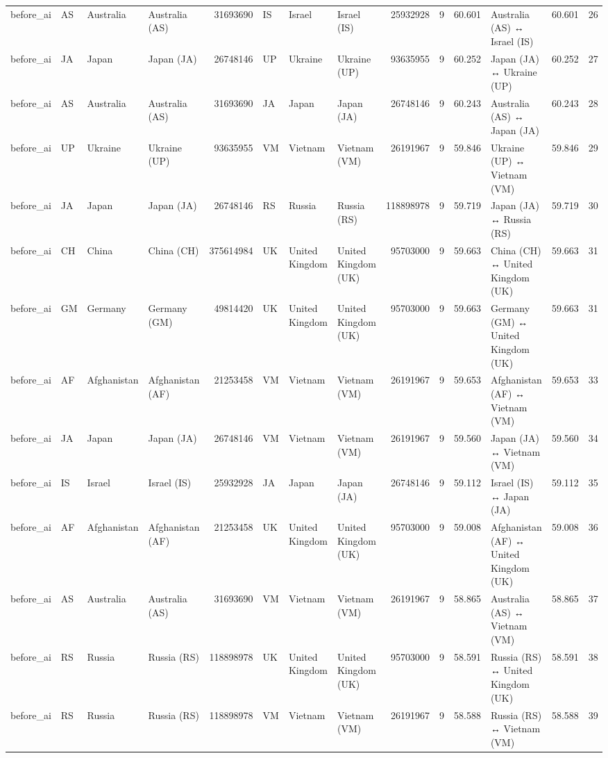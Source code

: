 \begin{tabular}{llllrlllrrrlrr}
before\_ai & AS & Australia & Australia (AS) & 31693690 & IS & Israel & Israel (IS) & 25932928 & 9 & 60.601 & Australia (AS) ↔ Israel (IS) & 60.601 & 26 \\
before\_ai & JA & Japan & Japan (JA) & 26748146 & UP & Ukraine & Ukraine (UP) & 93635955 & 9 & 60.252 & Japan (JA) ↔ Ukraine (UP) & 60.252 & 27 \\
before\_ai & AS & Australia & Australia (AS) & 31693690 & JA & Japan & Japan (JA) & 26748146 & 9 & 60.243 & Australia (AS) ↔ Japan (JA) & 60.243 & 28 \\
before\_ai & UP & Ukraine & Ukraine (UP) & 93635955 & VM & Vietnam & Vietnam (VM) & 26191967 & 9 & 59.846 & Ukraine (UP) ↔ Vietnam (VM) & 59.846 & 29 \\
before\_ai & JA & Japan & Japan (JA) & 26748146 & RS & Russia & Russia (RS) & 118898978 & 9 & 59.719 & Japan (JA) ↔ Russia (RS) & 59.719 & 30 \\
before\_ai & CH & China & China (CH) & 375614984 & UK & United Kingdom & United Kingdom (UK) & 95703000 & 9 & 59.663 & China (CH) ↔ United Kingdom (UK) & 59.663 & 31 \\
before\_ai & GM & Germany & Germany (GM) & 49814420 & UK & United Kingdom & United Kingdom (UK) & 95703000 & 9 & 59.663 & Germany (GM) ↔ United Kingdom (UK) & 59.663 & 31 \\
before\_ai & AF & Afghanistan & Afghanistan (AF) & 21253458 & VM & Vietnam & Vietnam (VM) & 26191967 & 9 & 59.653 & Afghanistan (AF) ↔ Vietnam (VM) & 59.653 & 33 \\
before\_ai & JA & Japan & Japan (JA) & 26748146 & VM & Vietnam & Vietnam (VM) & 26191967 & 9 & 59.560 & Japan (JA) ↔ Vietnam (VM) & 59.560 & 34 \\
before\_ai & IS & Israel & Israel (IS) & 25932928 & JA & Japan & Japan (JA) & 26748146 & 9 & 59.112 & Israel (IS) ↔ Japan (JA) & 59.112 & 35 \\
before\_ai & AF & Afghanistan & Afghanistan (AF) & 21253458 & UK & United Kingdom & United Kingdom (UK) & 95703000 & 9 & 59.008 & Afghanistan (AF) ↔ United Kingdom (UK) & 59.008 & 36 \\
before\_ai & AS & Australia & Australia (AS) & 31693690 & VM & Vietnam & Vietnam (VM) & 26191967 & 9 & 58.865 & Australia (AS) ↔ Vietnam (VM) & 58.865 & 37 \\
before\_ai & RS & Russia & Russia (RS) & 118898978 & UK & United Kingdom & United Kingdom (UK) & 95703000 & 9 & 58.591 & Russia (RS) ↔ United Kingdom (UK) & 58.591 & 38 \\
before\_ai & RS & Russia & Russia (RS) & 118898978 & VM & Vietnam & Vietnam (VM) & 26191967 & 9 & 58.588 & Russia (RS) ↔ Vietnam (VM) & 58.588 & 39 \\

\end{tabular}
